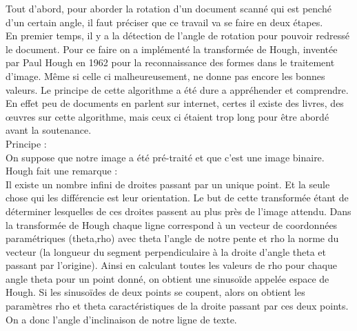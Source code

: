 \documentclass [french,12pt]{article}
\begin{document}
Tout d'abord, pour aborder la rotation d'un document scanné qui est penché d'un certain angle, il faut préciser que ce travail va se faire en deux étapes. 
\\En premier temps, il y a la détection de l'angle de rotation pour pouvoir redressé le document. Pour ce faire on a implémenté la transformée de Hough, inventée par Paul Hough en 1962 pour la reconnaissance des formes dans le traitement d'image. Même si celle ci malheureusement, ne donne pas encore les bonnes valeurs.
Le principe de cette algorithme a été dure a appréhender et comprendre. En effet peu de documents en parlent sur internet, certes il existe des livres, des œuvres sur cette algorithme, mais ceux ci étaient trop long pour être abordé avant la soutenance.
\\
Principe :\\
	On suppose que notre image a été pré-traité et que c’est une image binaire.
\\
Hough fait une remarque :
\\
Il existe un nombre infini de droites passant par un unique point. Et la seule chose qui les différencie est leur orientation.
Le but de cette transformée étant de déterminer lesquelles de ces droites passent au plus près de l’image attendu. Dans la transformée de Hough chaque ligne correspond à un vecteur de coordonnées paramétriques (theta,rho) avec theta l’angle de notre pente et rho la norme du vecteur (la longueur du segment perpendiculaire à la droite d'angle theta et passant par l'origine). Ainsi en calculant toutes les valeurs de rho pour chaque angle theta pour un point donné, on obtient une sinusoïde appelée espace de Hough. Si les sinusoïdes de deux points se coupent, alors on obtient les paramètres rho et theta caractéristiques de la droite passant par ces deux points. On a donc l’angle d’inclinaison de notre ligne de texte.
\end{document}
